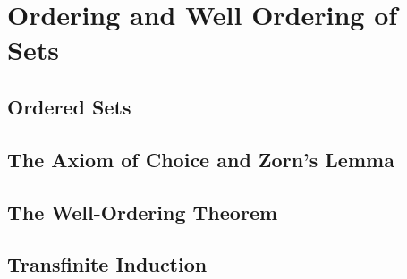 \section{Ordering and Well Ordering of Sets}

\subsection{Ordered Sets}

\subsection{The Axiom of Choice and Zorn's Lemma}

\subsection{The Well-Ordering Theorem}

\subsection{Transfinite Induction}


